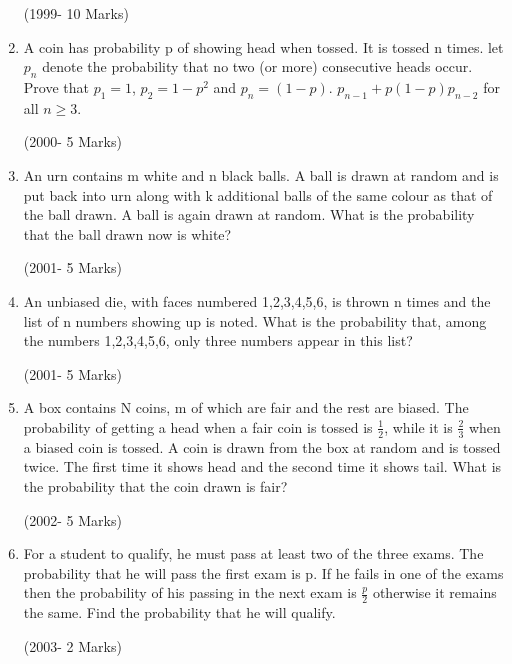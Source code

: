 \documentclass[journal,12pt,twocolumn]{IEEEtran}
\theoremstyle{remark}
\begin{document}
\begin{enumerate}
\hfill(1999- 10 Marks)

\item A coin has probability p of showing head when tossed. It is tossed n times. let $p_{n}$ denote the probability that no two (or more) consecutive heads occur. Prove that $p_{1}=1$, $p_{2}=1-p^2$ and $p_{n}=(1-p)$. $p_{n-1}+p(1-p)p_{n-2}$ for all $n \geq 3$. 

\hfill(2000- 5 Marks)

\item An urn contains m white and n black balls. A ball is drawn at random and is put back into urn along with k additional balls of the same colour as that of the ball drawn. A ball is again drawn at random. What is the probability that the ball drawn now is white?

\hfill(2001- 5 Marks)

\item An unbiased die, with faces numbered 1,2,3,4,5,6, is thrown n times and the list of n numbers showing up is noted. What is the probability that, among the numbers 1,2,3,4,5,6, only three numbers appear in this list?

\hfill(2001- 5 Marks)

\item A box contains N coins, m of which are fair and the rest are biased. The probability of getting a head when a fair coin is tossed is $\frac{1}{2}$, while it is $\frac{2}{3}$ when a biased coin is tossed. A coin is drawn from the box at random and is tossed twice. The first time it shows head and the second time it shows tail. What is the probability that the coin drawn is fair?

\hfill(2002- 5 Marks)

\item For a student to qualify, he must pass at least two of the three exams. The probability that he will pass the first exam is p. If he fails in one of the exams then the probability of his passing in the next exam is $\frac{p}{2}$ otherwise it remains the same. Find the probability that he will qualify.

\hfill(2003- 2 Marks)
\end{enumerate}
\end{document}
